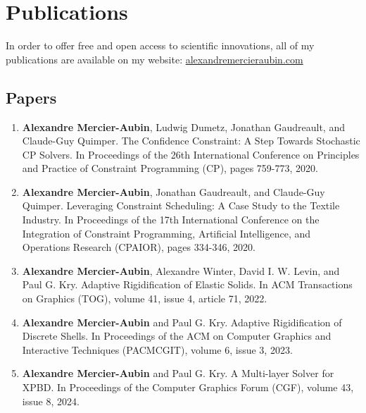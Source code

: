 \documentclass[10pt]{article} %
\begin{document}


\section{Publications}
In order to offer free and open access to scientific innovations, all of my publications are available on my website: \href{https://www.alexandremercieraubin.com/Work/posts/}{alexandremercieraubin.com}

\subsection{Papers}
%
%
\begin{enumerate}
  \setcounter{enumi}{\value{listCounter}}
  \item \textbf{Alexandre Mercier-Aubin}, Ludwig Dumetz, Jonathan Gaudreault, and Claude-Guy Quimper. The Confidence Constraint: A Step Towards Stochastic CP Solvers. In Proceedings of the 26th International Conference on Principles and Practice of Constraint Programming (CP), pages 759-773, 2020. 

 \item \textbf{Alexandre Mercier-Aubin}, Jonathan Gaudreault, and Claude-Guy Quimper. Leveraging Constraint Scheduling: A Case Study to the Textile Industry. In Proceedings of the 17th International Conference on the Integration of Constraint Programming, Artificial Intelligence, and Operations Research (CPAIOR), pages 334-346, 2020. 

 \item \textbf{Alexandre Mercier-Aubin},  Alexandre Winter,  David I. W. Levin, and Paul G. Kry. Adaptive Rigidification of Elastic Solids. In ACM Transactions on Graphics (TOG), volume 41, issue 4, article 71, 2022.  

 \item \textbf{Alexandre Mercier-Aubin} and Paul G. Kry. Adaptive Rigidification of Discrete Shells. In Proceedings of the ACM on Computer Graphics and Interactive Techniques (PACMCGIT), volume 6, issue 3, 2023. 

\item \textbf{Alexandre Mercier-Aubin} and Paul G. Kry. A Multi-layer Solver for XPBD. In Proceedings of the Computer Graphics Forum (CGF), volume 43, issue 8, 2024. 
\end{enumerate}
\end{document}
